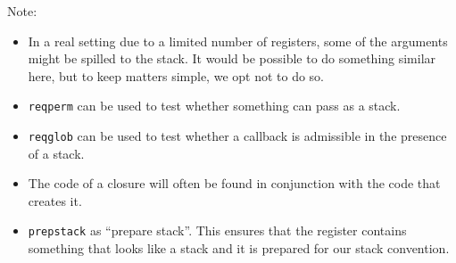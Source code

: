 \documentclass[a4paper]{article}
\begin{document}
              Note:
              \begin{itemize}
              \item In a real setting due to a limited number of registers, some of the arguments might be spilled to the stack. It would be possible to do something similar here, but to keep
                matters simple, we opt not to do so.
              \item \texttt{reqperm} can be used to test whether something can pass as a stack.
              \item \texttt{reqglob} can be used to test whether a callback is admissible in the presence of a stack.
              \item The code of a closure will often be found in conjunction with the code that creates it.
              \item \texttt{prepstack} as ``prepare stack''. This ensures that the register contains something that looks like a stack and it is prepared for our stack convention.
              \end{itemize}
\end{document}
